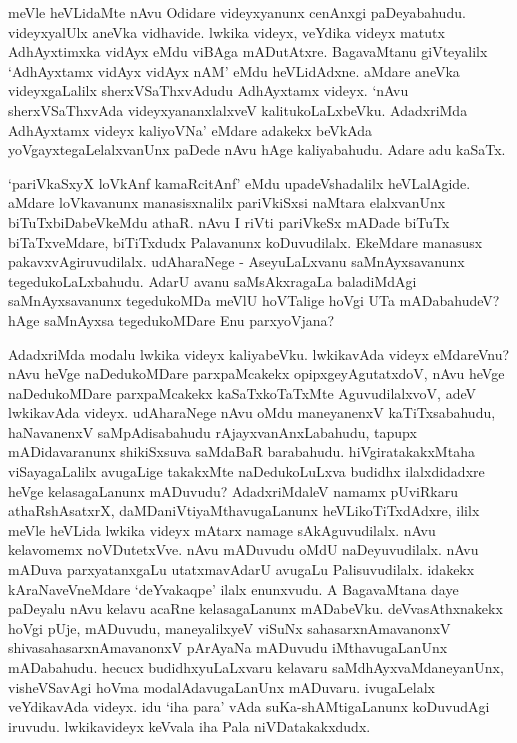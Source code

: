 meVle heVLidaMte nAvu Odidare videyxyanunx cenAnxgi paDeyabahudu. videyxyalUlx aneVka vidhavide. lwkika videyx, veYdika videyx matutx 
AdhAyxtimxka vidAyx  eMdu viBAga mADutAtxre. BagavaMtanu giVteyalilx `AdhAyxtamx vidAyx vidAyx nAM' eMdu heVLidAdxne. aMdare aneVka 
videyxgaLalilx sherxVSaThxvAdudu AdhAyxtamx videyx. `nAvu sherxVSaThxvAda videyxyananxlalxveV kalitukoLaLxbeVku. AdadxriMda AdhAyxtamx videyx kaliyoVNa' 
eMdare adakekx beVkAda yoVgayxtegaLelalxvanUnx paDede nAvu hAge kaliyabahudu. Adare adu kaSaTx.

`pariVkaSxyX loVkAnf kamaRcitAnf' eMdu upadeVshadalilx heVLalAgide. aMdare loVkavanunx manasisxnalilx pariVkiSxsi naMtara elalxvanUnx biTuTxbiDabeVkeMdu athaR. 
nAvu I riVti pariVkeSx mADade biTuTx biTaTxveMdare, biTiTxdudx Palavanunx koDuvudilalx. EkeMdare manasusx pakavxvAgiruvudilalx. udAharaNege - AseyuLaLxvanu 
saMnAyxsavanunx tegedukoLaLxbahudu. AdarU avanu saMsAkxragaLa baladiMdAgi saMnAyxsavanunx tegedukoMDa 
meVlU hoVTalige hoVgi UTa mADabahudeV? hAge saMnAyxsa tegedukoMDare Enu parxyoVjana?

AdadxriMda modalu lwkika videyx kaliyabeVku. lwkikavAda videyx eMdareVnu? nAvu heVge naDedukoMDare parxpaMcakekx opipxgeyAgutatxdoV, nAvu 
heVge naDedukoMDare parxpaMcakekx kaSaTxkoTaTxMte AguvudilalxvoV, adeV lwkikavAda videyx. udAharaNege nAvu oMdu maneyanenxV kaTiTxsabahudu, 
haNavanenxV saMpAdisabahudu rAjayxvanAnxLabahudu, tapupx mADidavaranunx shikiSxsuva saMdaBaR barabahudu. hiVgiratakakxMtaha viSayagaLalilx 
avugaLige takakxMte naDedukoLuLxva budidhx ilalxdidadxre heVge kelasagaLanunx mADuvudu? AdadxriMdaleV namamx pUviRkaru athaRshAsatxrX, 
daMDaniVtiyaMthavugaLanunx heVLikoTiTxdAdxre, ililx meVle heVLida lwkika videyx mAtarx namage sAkAguvudilalx. nAvu kelavomemx 
noVDutetxVve. nAvu mADuvudu oMdU naDeyuvudilalx. nAvu mADuva parxyatanxgaLu utatxmavAdarU avugaLu Palisuvudilalx. idakekx 
kAraNaveVneMdare `deYvakaqpe' ilalx enunxvudu. A BagavaMtana daye paDeyalu nAvu kelavu acaRne kelasagaLanunx mADabeVku. deVvasAthxnakekx 
hoVgi pUje, mADuvudu, maneyalilxyeV viSuNx sahasarxnAmavanonxV shivasahasarxnAmavanonxV pArAyaNa mADuvudu iMthavugaLanUnx 
mADabahudu. hecucx budidhxyuLaLxvaru kelavaru saMdhAyxvaMdaneyanUnx, visheVSavAgi hoVma modalAdavugaLanUnx mADuvaru. 
ivugaLelalx veYdikavAda videyx. idu `iha para' vAda suKa-shAMtigaLanunx koDuvudAgi iruvudu. lwkikavideyx keVvala iha Pala niVDatakakxdudx.

